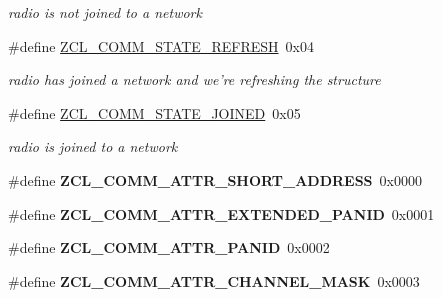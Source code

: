 \begin{DoxyCompactItemize}
\begin{DoxyCompactList}\small\item\em radio is not joined to a network \end{DoxyCompactList}\item 
\hypertarget{group__zcl__commissioning_gae9523cf195068a92283ba0d44424e105}{\#define \hyperlink{group__zcl__commissioning_gae9523cf195068a92283ba0d44424e105}{Z\-C\-L\-\_\-\-C\-O\-M\-M\-\_\-\-S\-T\-A\-T\-E\-\_\-\-R\-E\-F\-R\-E\-S\-H}~0x04}\label{group__zcl__commissioning_gae9523cf195068a92283ba0d44424e105}

\begin{DoxyCompactList}\small\item\em radio has joined a network and we're refreshing the structure \end{DoxyCompactList}\item 
\hypertarget{group__zcl__commissioning_ga4d8a61e021ef1c4826b18d6eb356c96e}{\#define \hyperlink{group__zcl__commissioning_ga4d8a61e021ef1c4826b18d6eb356c96e}{Z\-C\-L\-\_\-\-C\-O\-M\-M\-\_\-\-S\-T\-A\-T\-E\-\_\-\-J\-O\-I\-N\-E\-D}~0x05}\label{group__zcl__commissioning_ga4d8a61e021ef1c4826b18d6eb356c96e}

\begin{DoxyCompactList}\small\item\em radio is joined to a network \end{DoxyCompactList}\item 
\hypertarget{group__zcl__commissioning_gaab7f9cfea2353bff92f5aeb2594ca8e3}{\#define {\bfseries Z\-C\-L\-\_\-\-C\-O\-M\-M\-\_\-\-A\-T\-T\-R\-\_\-\-S\-H\-O\-R\-T\-\_\-\-A\-D\-D\-R\-E\-S\-S}~0x0000}\label{group__zcl__commissioning_gaab7f9cfea2353bff92f5aeb2594ca8e3}

\item 
\hypertarget{group__zcl__commissioning_ga9a4892bd6e84796fe6bf8ace85c642cb}{\#define {\bfseries Z\-C\-L\-\_\-\-C\-O\-M\-M\-\_\-\-A\-T\-T\-R\-\_\-\-E\-X\-T\-E\-N\-D\-E\-D\-\_\-\-P\-A\-N\-I\-D}~0x0001}\label{group__zcl__commissioning_ga9a4892bd6e84796fe6bf8ace85c642cb}

\item 
\hypertarget{group__zcl__commissioning_ga0349ff92388b56a9c5ca0d9cf5f77b4e}{\#define {\bfseries Z\-C\-L\-\_\-\-C\-O\-M\-M\-\_\-\-A\-T\-T\-R\-\_\-\-P\-A\-N\-I\-D}~0x0002}\label{group__zcl__commissioning_ga0349ff92388b56a9c5ca0d9cf5f77b4e}

\item 
\hypertarget{group__zcl__commissioning_gada5c0da80bfed9dfd9d5acc79f59c020}{\#define {\bfseries Z\-C\-L\-\_\-\-C\-O\-M\-M\-\_\-\-A\-T\-T\-R\-\_\-\-C\-H\-A\-N\-N\-E\-L\-\_\-\-M\-A\-S\-K}~0x0003}\label{group__zcl__commissioning_gada5c0da80bfed9dfd9d5acc79f59c020}


\end{DoxyCompactItemize}
